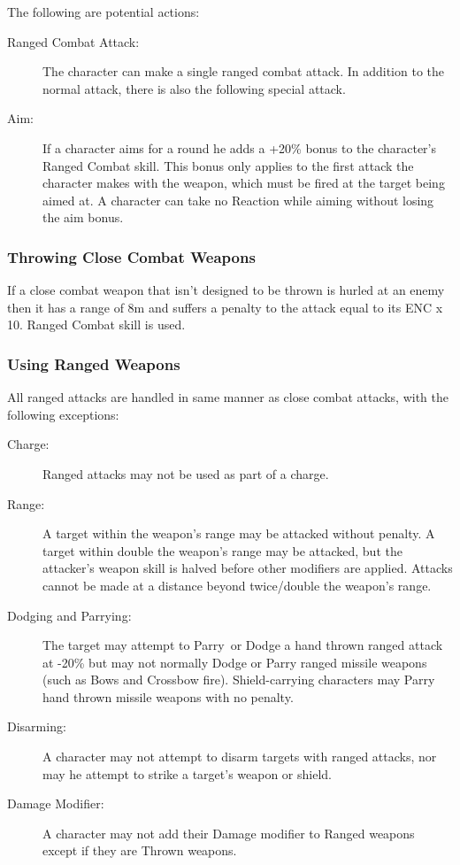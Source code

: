 The following are potential actions:
\begin{description}
\item[Ranged Combat Attack:] The character can make a single ranged combat attack. In addition to the normal attack, there is also the following special attack.
\item[Aim:] If a character aims for a round he adds a +20\% bonus to the character’s Ranged Combat skill. This bonus only applies to the first attack the character makes with the weapon, which must be fired at the target being aimed at. A character can take no Reaction while aiming without losing the aim bonus.
\end{description}

\subsubsection{Throwing Close Combat Weapons}
If a close combat weapon that isn’t designed to be thrown is hurled at an enemy then it has a range of 8m and suffers a penalty to the attack equal to its ENC x 10. Ranged Combat skill is used. 

\subsubsection{Using Ranged Weapons}
All ranged attacks are handled in same manner as close combat attacks, with the following exceptions: 
\begin{description}
\item[Charge:] Ranged attacks may not be used as part of a charge.
\item[Range:] A target within the weapon’s range may be attacked without penalty. A target within double the weapon’s range may be attacked, but the attacker’s weapon skill is halved before other modifiers are applied. Attacks cannot be made at a distance beyond twice/double the weapon’s range.
\item[Dodging and Parrying:] The target may attempt to Parry or Dodge a hand thrown ranged attack at -20\% but may not normally Dodge or Parry ranged missile weapons (such as Bows and Crossbow fire). Shield-carrying characters may Parry hand thrown missile weapons with no penalty.
\item[Disarming:] A character may not attempt to disarm targets with ranged attacks, nor may he attempt to strike a target’s weapon or shield.
\item[Damage Modifier:] A character may not add their Damage modifier to Ranged weapons except if they are Thrown weapons.

\end{description}

